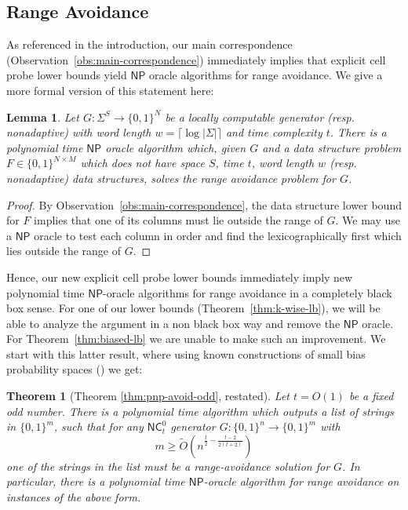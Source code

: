 \documentclass[11pt]{article}
\newtheorem*{theorem*}{Theorem}
\newtheorem{lemma}{Lemma}
\newcommand{\B}{\{0,1\}}
\begin{document}
\subsection{Range Avoidance}
As referenced in the introduction, our main correspondence (Observation~\ref{obs:main-correspondence}) immediately implies that explicit cell probe lower bounds yield $\mathsf{NP}$ oracle algorithms for range avoidance. We give a more formal version of this statement here:
\begin{lemma}\label{lem:lb-yields-pnp-avoid}
Let $G: \Sigma^S \to \B^N$ be a locally computable generator (resp. nonadaptive) with word length $w = \lceil \log |\Sigma|\rceil $ and time complexity $t$. There is a polynomial time $\mathsf{NP}$ oracle algorithm which, given $G$ and a data structure problem $F \in \B^{N \times M}$ which does not have space $S$, time $t$, word length $w$ (resp. nonadaptive) data structures, solves the range avoidance problem for $G$.
\end{lemma}
\begin{proof}
By Observation~\ref{obs:main-correspondence}, the data structure lower bound for $F$ implies that one of its columns must lie outside the range of $G$. We may use a $\mathsf{NP}$ oracle to test each column in order and find the lexicographically first which lies outside the range of $G$.
\end{proof}
Hence, our new explicit cell probe lower bounds immediately imply new polynomial time $\mathsf{NP}$-oracle algorithms for range avoidance in a completely black box sense. 
For one of our lower bounds (Theorem~\ref{thm:k-wise-lb}), we will be able to analyze the argument in a non black box way and remove the $\mathsf{NP}$ oracle. For Theorem~\ref{thm:biased-lb} we are unable to make such an improvement. We start with this latter result, where using known constructions of small bias probability spaces (\cite{naornaor}) we get:

\begin{theorem*}[Theorem \ref{thm:pnp-avoid-odd}, restated]
Let $t = O(1)$ be a fixed odd number. There is a polynomial time algorithm which outputs a list of strings in $\{0,1\}^m$, such that for any $\mathsf{NC}^0_t$ generator $G: \B^n \to \B^m$ with
\[
m \geq  \tilde{O}( n^{\frac{t}{2} - \frac{t-2}{2(t+2)}})
\]
one of the strings in the list must be a range-avoidance solution for $G$. In particular, there is a polynomial time $\mathsf{NP}$-oracle algorithm for range avoidance on instances of the above form.
\end{theorem*}
\end{document}

